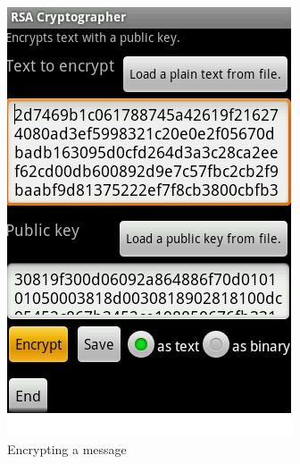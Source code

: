 \documentclass[a4paper,10pt]{report}
\begin{document}
\begin{figure}
        \centering
        \begin{subfigure}[b]{0.45\textwidth}
                \centering
                \includegraphics[width=\textwidth]{images/cat2.jpg}
                \caption{Encrypting a message}
                \label{fig:cat2}
        \end{subfigure}
	\begin{subfigure}[b]{0.45\textwidth}
                \centering

\end{subfigure}
\end{figure}
\end{document}
